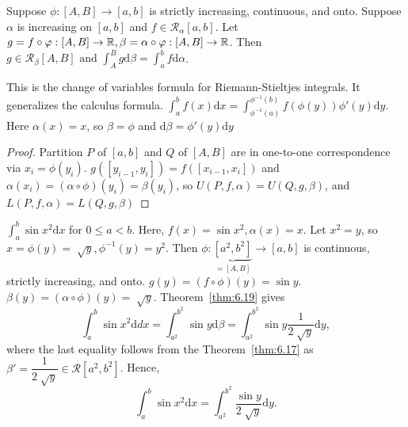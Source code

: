 \begin{thm}[19]
	Suppose $\phi:[A,B]\to [a,b]$ is strictly increasing, continuous, and onto.
	Suppose $\alpha$ is increasing on $[a,b]$ and $f \in \mathscr{R}_{\alpha}[a,b]$.
	Let $g=f \circ \varphi: [A,B]\to \mathbb{R}, \beta=\alpha \circ \varphi: [A,B]\to \mathbb{R}$.
	Then $g \in \mathscr{R}_{\beta}[A,B] \text{ and } \int_{A}^{B}{g\mathrm{d}\beta}= \int_{a}^{b}{f\mathrm{d}\alpha}$.
	\begin{note}
		This is the change of variables formula for Riemann-Stieltjes integrals.
		It generalizes the calculus formula.
		$\int_{a}^{b}{f(x)\mathrm{d}x}=\int_{{\phi ^{-1}}(a)}^{\phi^{-1}(b)}{f(\phi(y))\phi'(y)\mathrm{d}y}$. Here $\alpha(x)=x$, so $\beta=\phi$ and $\mathrm{d}\beta=\phi'(y)\mathrm{d}y$
	\end{note}

	\begin{proof}
		Partition $P$ of $[a,b]$ and $Q$ of $[A,B]$ are in one-to-one correspondence via $x_i=\phi(y_i)$.
		$g([y_{i-1},y_{i}])=f([x_{i-1},x_{i}])$ and $\alpha(x_{i})=(\alpha \circ \phi)(y_i)=\beta(y_i)$, so $U(P,f,\alpha)=U(Q,g,\beta)$, and $L(P,f,\alpha)=L(Q,g,\beta)$
	\end{proof}
	\begin{example}
		$\int_{a}^{b}{\sin{x^2}\mathrm{d}x}$ for $0\le a<b$.
		Here, $f(x)=\sin{x^2},\alpha(x)=x$.
		Let $x^2=y$, so $x=\phi(y)=\sqrt[]{y}, \phi^{-1}(y)=y^2$.
		Then $\phi:\underbrace{[a^2,b^2]}_{=[A,B]}\to [a,b]$ is continuous, strictly increasing, and onto.
		$g(y)=(f \circ \phi)(y)=\sin{y}$.
		$\beta(y)=(\alpha \circ \phi)(y)=\sqrt[]{y}$.
		Theorem~\ref{thm:6.19} gives
		\[
			\int_{a}^{b}{\sin{x^2}\mathrm{d}dx}
			=\int_{a^2}^{b^2}{\sin{y}\mathrm{d}\beta}
			=\int_{a^2}^{b^2}{\sin{y}\dfrac{1}{2\sqrt[]{y}}\mathrm{d}y}
			,\]
		where the last equality follows from the Theorem~\ref{thm:6.17} as $\beta'=\dfrac{1}{2 \sqrt[]{y}} \in \mathscr{R}[a^2,b^2]$.
		Hence,
		\[
			\int_{a}^{b}{\sin{x^2}\mathrm{d}x}=\int_{a^2}^{b^2}{\dfrac{\sin{y}}{2\sqrt[]{y}}\mathrm{d}y}.
		\]
	\end{example}
\end{thm}
